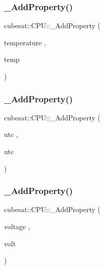 \subsubsection{\texorpdfstring{\+\_\+\+Add\+Property()}{\_AddProperty()}\hspace{0.1cm}{\footnotesize\ttfamily [1/12]}}
{\footnotesize\ttfamily cubesat\+::\+C\+P\+U\+::\+\_\+\+Add\+Property (\begin{DoxyParamCaption}\item[{temperature}]{,  }\item[{temp}]{ }\end{DoxyParamCaption})}

\mbox{\label{classcubesat_1_1CPU_ab2bfa609208db1d82154958556295bd7}} 
\subsubsection{\texorpdfstring{\+\_\+\+Add\+Property()}{\_AddProperty()}\hspace{0.1cm}{\footnotesize\ttfamily [2/12]}}
{\footnotesize\ttfamily cubesat\+::\+C\+P\+U\+::\+\_\+\+Add\+Property (\begin{DoxyParamCaption}\item[{utc}]{,  }\item[{utc}]{ }\end{DoxyParamCaption})}

\mbox{\label{classcubesat_1_1CPU_a3839c4adb3b7deee883e9eebb7dbabad}} 
\subsubsection{\texorpdfstring{\+\_\+\+Add\+Property()}{\_AddProperty()}\hspace{0.1cm}{\footnotesize\ttfamily [3/12]}}
{\footnotesize\ttfamily cubesat\+::\+C\+P\+U\+::\+\_\+\+Add\+Property (\begin{DoxyParamCaption}\item[{voltage}]{,  }\item[{volt}]{ }\end{DoxyParamCaption})}

